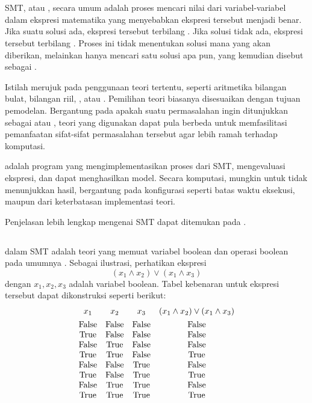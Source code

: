 \section{}

SMT, atau , secara umum adalah proses mencari nilai dari variabel-variabel dalam ekspresi matematika yang menyebabkan ekspresi tersebut menjadi benar. Jika suatu solusi ada, ekspresi tersebut terbilang . Jika solusi tidak ada, ekspresi tersebut terbilang . Proses ini tidak menentukan solusi mana yang akan diberikan, melainkan hanya mencari satu solusi apa pun, yang kemudian disebut sebagai .

Istilah  merujuk pada penggunaan teori tertentu, seperti aritmetika bilangan bulat, bilangan riil, , atau . Pemilihan teori biasanya disesuaikan dengan tujuan pemodelan. Bergantung pada apakah suatu permasalahan ingin ditunjukkan sebagai  atau , teori yang digunakan dapat pula berbeda untuk memfasilitasi pemanfaatan sifat-sifat permasalahan tersebut agar lebih ramah terhadap komputasi.

 adalah program yang mengimplementasikan proses dari SMT, mengevaluasi ekspresi, dan dapat menghasilkan model. Secara komputasi,  mungkin untuk tidak menunjukkan hasil, bergantung pada konfigurasi seperti batas waktu eksekusi, maupun dari keterbatasan implementasi teori.

Penjelasan lebih lengkap mengenai SMT dapat ditemukan pada \cite{barrett2018}.

\subsection{}

 dalam SMT adalah teori yang memuat variabel boolean dan operasi boolean pada umumnya \citep{yurichev}. Sebagai ilustrasi, perhatikan ekspresi
	\[ (x_1 \land x_2) \lor (x_1 \land x_3) \]
dengan \(x_1, x_2, x_3\) adalah variabel boolean. Tabel kebenaran untuk ekspresi tersebut dapat dikonstruksi seperti berikut:
\vspace{-0.5em}
\[
\begin{array}{cccc}
	x_1 & x_2 & x_3 & (x_1 \land x_2) \lor (x_1 \land x_3) \\ [4pt]
	\mathrm{False} & \mathrm{False} & \mathrm{False} & \mathrm{False} \\
	 \mathrm{True} & \mathrm{False} & \mathrm{False} & \mathrm{False} \\
	\mathrm{False} &  \mathrm{True} & \mathrm{False} & \mathrm{False} \\
	 \mathrm{True} &  \mathrm{True} & \mathrm{False} &  \mathrm{True} \\
	\mathrm{False} & \mathrm{False} &  \mathrm{True} & \mathrm{False} \\
	 \mathrm{True} & \mathrm{False} &  \mathrm{True} &  \mathrm{True} \\
	\mathrm{False} &  \mathrm{True} &  \mathrm{True} & \mathrm{False} \\
	 \mathrm{True} &  \mathrm{True} &  \mathrm{True} &  \mathrm{True}
\end{array}
\]

